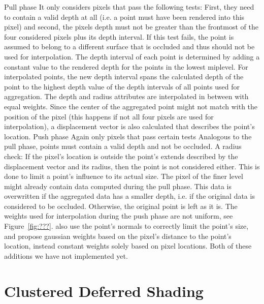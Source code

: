 \begin{outline}
\1 Pull phase
    \2 It only considers pixels that pass the following tests: First, they need to contain a valid depth at all (i.e. a point must have been rendered into this pixel) and second, the pixels depth must not be greater than the frontmost of the four considered pixels plus its depth interval. If this test fails, the point is assumed to belong to a different surface that is occluded and thus should not be used for interpolation.
    \2 The depth interval of each point is determined by adding a constant value to the rendered depth for the points in the lowest miplevel. For interpolated points, the new depth interval spans the calculated depth of the point to the highest depth value of the depth intervals of all points used for aggregation.
    \2 The depth and radius attributes are interpolated in between with equal weights. Since the center of the aggregated point might not match with the position of the pixel (this happens if not all four pixels are used for interpolation), a displacement vector is also calculated that describes the point's location.
\1 Push phase
    \2 Again only pixels that pass certain tests
        \3 Analogous to the pull phase, points must contain a valid depth and not be occluded.
        \3 A radius check: If the pixel's location is outside the point's extends described by the displacement vector and its radius, then the point is not considered either. This is done to limit a point's influence to its actual size.
    \2 The pixel of the finer level might already contain data computed during the pull phase. This data is overwritten if the aggregated data has a smaller depth, i.e. if the original data is considered to be occluded. Otherwise, the original point is left as it is.
    \2 The weights used for interpolation during the push phase are not uniform, see Figure~\ref{fig:???}.
\1 \citet{Marroquim:2007:reconstruction} also use the point's normals to correctly limit the point's size, and \citet{Marroquim:2008:reconstruction2} propose gaussian weights based on the pixel's distance to the point's location, instead constant weights solely based on pixel locations. Both of these additions we have not implemented yet.
\end{outline}



\section{Clustered Deferred Shading}
\label{sec:concept:clusteredShading}

